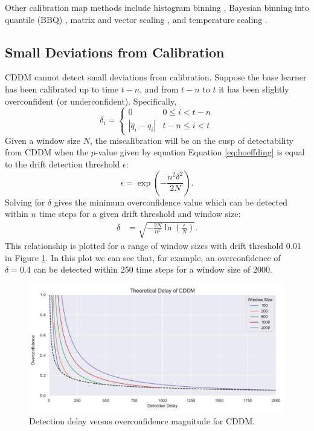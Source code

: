 Other calibration map methods include histogram binning \cite{histogram_calibration}, Bayesian binning into quantile (BBQ) \cite{bbq_binning}, matrix and vector scaling \cite{nn_calibration}, and temperature scaling \cite{nn_calibration}\cite{temperature_scaling}.

\subsection{Small Deviations from Calibration}

CDDM cannot detect small deviations from calibration. Suppose the base learner has been calibrated up to time $t-n$, and from $t-n$ to $t$ it has been slightly overconfident (or underconfident). Specifically,
\begin{equation}
    \delta_i = \begin{cases}
        0 & 0 \le i < t-n \\ 
        \left| \hat{q}_i - q_i \right| & t-n \le i < t
    \end{cases}
\end{equation}
Given a window size $N$, the miscalibration will be on the cusp of detectability from CDDM when the $p$-value given by equation Equation \ref{eq:hoeffding} is equal to the drift detection threshold $\epsilon$: 
\begin{equation}
    \epsilon = \exp\left(-\frac{n^2\delta^2}{2N}\right).
\end{equation}
Solving for $\delta$ gives the minimum overconfidence value which can be detected within $n$ time steps for a given drift threshold and window size:
\begin{align}
    \delta &= \sqrt{-\frac{2N}{n^2}\ln\left(\frac{\epsilon}{N}\right)}.
\end{align}
This relationship is plotted for a range of window sizes with drift threshold 0.01 in Figure \ref{fig:cddm_window_size}. In this plot we can see that, for example, an overconfidence of $\delta=0.4$ can be detected within 250 time steps for a window size of 2000.

\begin{figure}
    \centering
    \includegraphics[width=\textwidth]{images/cddm_window_size.pdf}
    \caption{Detection delay versus overconfidence magnitude for CDDM.}
    \label{fig:cddm_window_size}
\end{figure}

